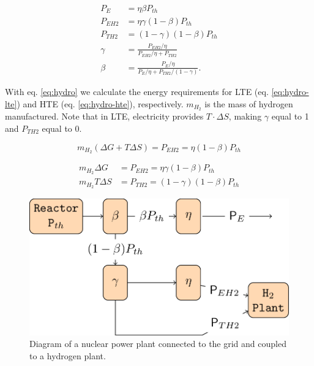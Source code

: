 \documentclass{anstrans}
\begin{document}
\begin{equation}
\begin{split}
P_{E} &= \eta \beta P_{th}
\\
P_{EH2} &= \eta \gamma (1-\beta) P_{th}
\\
P_{TH2} &= (1-\gamma) (1-\beta) P_{th}
\\
\gamma &= \frac{P_{EH2} / \eta}{P_{EH2} / \eta + P_{TH2}}
\\
\beta &= \frac{P_{E} / \eta}{P_{E} / \eta + P_{TH2}/(1-\gamma)}.
\end{split}
\label{eq:hydro}
\end{equation}

With eq. \ref{eq:hydro} we calculate the energy requirements for \gls{LTE} (eq. \ref{eq:hydro-lte}) and \gls{HTE} (eq. \ref{eq:hydro-hte}), respectively. $m_{H_2}$ is the mass of hydrogen manufactured. Note that in \gls{LTE}, electricity provides $T \cdot \Delta S$, making $\gamma$ equal to 1 and $P_{TH2}$ equal to 0.

\begin{equation}
m_{H_2} (\Delta G + T\Delta S) = P_{EH2} = \eta (1-\beta) P_{th}
\label{eq:hydro-lte}
\end{equation}

\begin{equation}
\begin{split}
m_{H_2} \Delta G &= P_{EH2} = \eta \gamma (1-\beta) P_{th}
\\
m_{H_2} T\Delta S &= P_{TH2} = (1-\gamma) (1-\beta) P_{th}
\end{split}
\label{eq:hydro-hte}
\end{equation}

\begin{figure}[htbp!]
	\centering
	\includegraphics[width=1.0\linewidth]{figures/hte-figure0.png}
	\hfill
	\caption{Diagram of a nuclear power plant connected to the grid and coupled to a hydrogen plant.}
	\label{fig:h2diag}
\end{figure}
\end{document}
